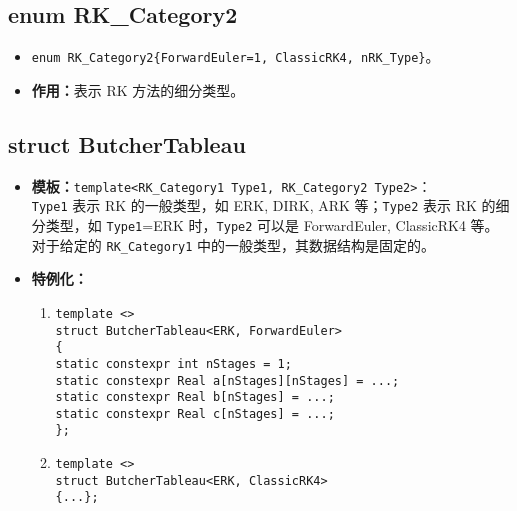 \documentclass[a4paper,twoside]{ctexart}
\begin{document}
\subsection{enum RK\_Category2}
\begin{itemize}
    \item \texttt{enum RK\_Category2\{ForwardEuler=1, ClassicRK4, nRK\_Type\}}。
    \item \textbf{作用：}表示 RK 方法的细分类型。
\end{itemize}

\subsection{struct ButcherTableau}
\begin{itemize}
    \item \textbf{模板：}\texttt{template<RK\_Category1 Type1, RK\_Category2 Type2>}：\\\texttt{Type1} 表示 RK 的一般类型，如 ERK, DIRK, ARK 等；\texttt{Type2} 表示 RK 的细分类型，如 \texttt{Type1}=ERK 时，\texttt{Type2} 可以是 ForwardEuler, ClassicRK4 等。对于给定的 \texttt{RK\_Category1} 中的一般类型，其数据结构是固定的。
    \item \textbf{特例化：}
            \begin{enumerate}[(1)]
                \item \texttt{template <>\\
                struct ButcherTableau<ERK, ForwardEuler>\\
                \{\\
                \hspace*{4pt} static constexpr int nStages = 1;\\
                \hspace*{4pt} static constexpr Real a[nStages][nStages] = ...;\\
                \hspace*{4pt} static constexpr Real b[nStages] = ...;\\
                \hspace*{4pt} static constexpr Real c[nStages] = ...;\\
                \};}
            \item \texttt{template <>\\
                struct ButcherTableau<ERK, ClassicRK4>\\
                \{...\};}
            \end{enumerate} 
\end{itemize}
\end{document}
